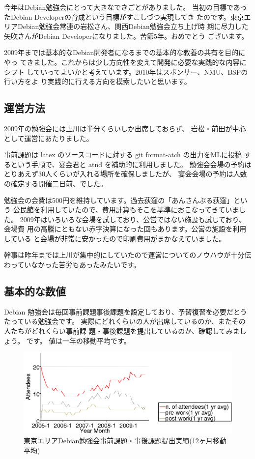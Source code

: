 \documentclass[mingoth,a4paper]{jsarticle}
\begin{document}
今年はDebian勉強会にとって大きなできごとがありました。
当初の目標であったDebian Developerの育成という目標がすこしづつ実現してき
たのです。東京エリアDebian勉強会常連の岩松さん、関西Debian勉強会立ち上げ時
期に尽力した矢吹さんがDebian Developerになりました。苦節5年。おめでとう
ございます。

2009年までは基本的なDebian開発者になるまでの基本的な教養の共有を目的にやっ
てきました。これからは少し方向性を変えて開発に必要な実践的な内容にシフト
していってよいかと考えています。2010年はスポンサー、NMU、BSPの行い方をよ
り実践的に行える方向を模索したいと思います。

\subsection{運営方法}

2009年の勉強会には上川は半分くらいしか出席しておらず、
岩松・前田が中心として運営にあたりました。

事前課題は latex のソースコードに対する git format-atch の出力をMLに投稿
するという手順で、宴会君と atnd を補助的に利用しました。
勉強会会場の予約はとりあえず30人くらいが入れる場所を確保しましたが、
宴会会場の予約は人数の確定する開催二日前、でした。

勉強会の会費は500円を維持しています。過去荻窪の「あんさんぶる荻窪」という
公民館を利用していたので、費用計算もそこを基準におこなってきていました。
2009年はいろいろな会場を試しており、公営ではない施設も試しており、会場費
用の高騰にともない赤字決算になった回もあります。公営の施設を利用している
と会場が非常に安かったので印刷費用がまかなえていました。

幹事は昨年までは上川が集中的にしていたので運営についてのノウハウが十分伝
わっていなかった苦労もあったみたいです。

\subsection{基本的な数値}

Debian 勉強会は毎回事前課題事後課題を設定しており、予習復習を必要だとう
たっている勉強会です。
実際にどれくらいの人が出席しているのか、またその人たちがどれくらい事前課
題・事後課題を提出しているのか、確認してみましょう。
です。
値は一年の移動平均です。

\begin{figure}[ht]
 \includegraphics[width=1\hsize]{image200912/memberanalysis/attend.png}
\caption{東京エリアDebian勉強会事前課題・事後課題提出実績(12ヶ月移動平均)}\label{fig:attendandprepostwork}
\end{figure}
\end{document}
